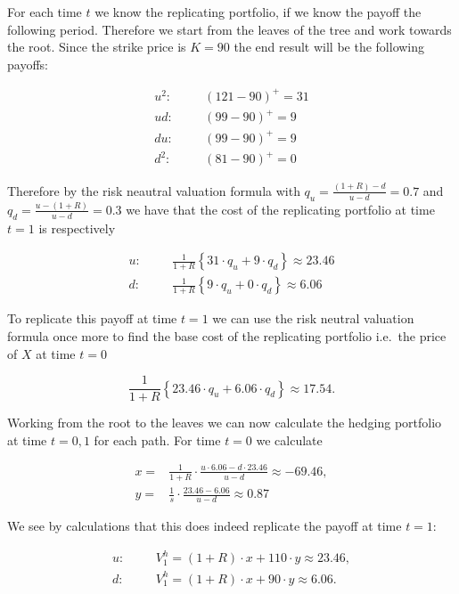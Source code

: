 \documentclass[
]{article}
\begin{document}
For each time \(t\) we know the replicating portfolio, if we know the
payoff the following period. Therefore we start from the leaves of the
tree and work towards the root. Since the strike price is \(K=90\) the
end result will be the following payoffs:

\begin{align*}
u^2:\hspace{20pt}&(121-90)^+=31\\
ud:\hspace{20pt}&(99-90)^+=9\\
du:\hspace{20pt}&(99-90)^+=9\\
d^2:\hspace{20pt}&(81-90)^+=0
\end{align*}

Therefore by the risk neautral valuation formula with
\(q_u=\frac{(1+R)-d}{u-d}=0.7\) and \(q_d=\frac{u-(1+R)}{u-d}=0.3\) we
have that the cost of the replicating portfolio at time \(t=1\) is
respectively

\begin{align*}
u:\hspace{20pt}&\frac{1}{1+R}\left\{31\cdot q_u + 9 \cdot q_d\right\}\approx 23.46\\
d:\hspace{20pt}&\frac{1}{1+R}\left\{9\cdot q_u + 0 \cdot q_d\right\}\approx 6.06
\end{align*}

To replicate this payoff at time \(t=1\) we can use the risk neutral
valuation formula once more to find the base cost of the replicating
portfolio i.e.~the price of \(X\) at time \(t=0\)

\[
\frac{1}{1+R}\left\{23.46\cdot q_u + 6.06 \cdot q_d\right\}\approx 17.54.
\]

Working from the root to the leaves we can now calculate the hedging
portfolio at time \(t=0,1\) for each path. For time \(t=0\) we calculate

\begin{align*}
x=&\frac{1}{1+R}\cdot \frac{u\cdot 6.06-d\cdot 23.46}{u-d}\approx -69.46,\\
y=&\frac{1}{s}\cdot\frac{23.46-6.06}{u-d}\approx0.87
\end{align*}

We see by calculations that this does indeed replicate the payoff at
time \(t=1\):

\begin{align*}
u:\hspace{20pt}&V_1^h=(1+R)\cdot x + 110\cdot y\approx 23.46,\\
d:\hspace{20pt}&V_1^h=(1+R)\cdot x + 90\cdot y\approx 6.06.
\end{align*}
\end{document}
